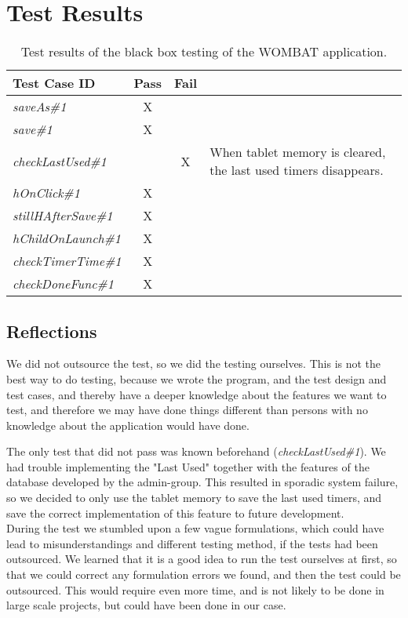 \section{Test Results}
	
	\begin{table}[width=\textwidth]
		\begin{center}
			\begin{tabular}{|l|c|c|p{6cm}|}
				\hline
				\textbf{Test Case ID} & \textbf{Pass} & \textbf{Fail} & \textbf{} \\
				\hline
				\textit{saveAs\#1} & X &  &  \\
				\hline
				\textit{save\#1} & X &  &  \\
				\hline
				\textit{checkLastUsed\#1} &  & X & When tablet memory is cleared, the last used timers disappears. \\
				\hline
				\textit{hOnClick\#1} & X &  &  \\
				\hline
				\textit{stillHAfterSave\#1} & X &  &  \\
				\hline
				\textit{hChildOnLaunch\#1} & X &  &  \\
				\hline
				\textit{checkTimerTime\#1} & X &  &  \\
				\hline
				\textit{checkDoneFunc\#1} & X &  &  \\
				\hline
			\end{tabular}
			\caption{Test results of the black box testing of the WOMBAT application.}
			\label{tab:bb_test_results}
		\end{center}
	\end{table}

\subsection{Reflections}
We did not outsource the test, so we did the testing ourselves. This is not the best way to do testing, because we wrote the program, and the test design and test cases, and thereby have a deeper knowledge about the features we want to test, and therefore we may have done things different than persons with no knowledge about the application would have done.

The only test that did not pass was known beforehand (\textit{checkLastUsed\#1}). We had trouble implementing the "Last Used" together with the features of the database developed by the admin-group. This resulted in sporadic system failure, so we decided to only use the tablet memory to save the last used timers, and save the correct implementation of this feature to future development.\\

During the test we stumbled upon a few vague formulations, which could have lead to misunderstandings and different testing method, if the tests had been outsourced. We learned that it is a good idea to run the test ourselves at first, so that we could correct any formulation errors we found, and then the test could be outsourced. This would require even more time, and is not likely to be done in large scale projects, but could have been done in our case.